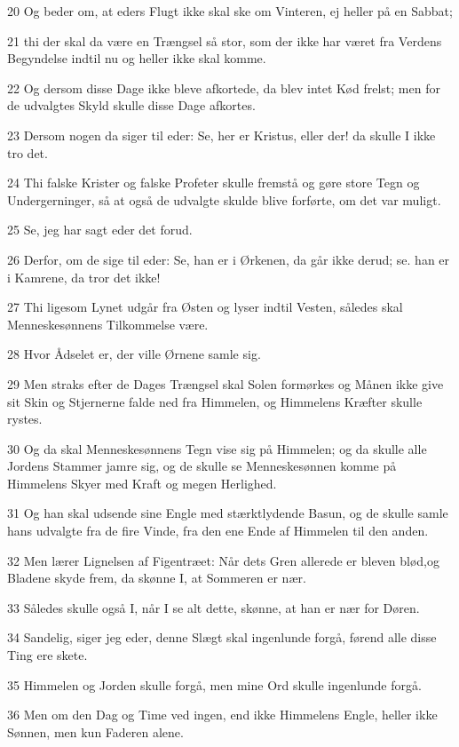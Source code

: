 \par 20 Og beder om, at eders Flugt ikke skal ske om Vinteren, ej heller på en Sabbat;
\par 21 thi der skal da være en Trængsel så stor, som der ikke har været fra Verdens Begyndelse indtil nu og heller ikke skal komme.
\par 22 Og dersom disse Dage ikke bleve afkortede, da blev intet Kød frelst; men for de udvalgtes Skyld skulle disse Dage afkortes.
\par 23 Dersom nogen da siger til eder: Se, her er Kristus, eller der! da skulle I ikke tro det.
\par 24 Thi falske Krister og falske Profeter skulle fremstå og gøre store Tegn og Undergerninger, så at også de udvalgte skulde blive forførte, om det var muligt.
\par 25 Se, jeg har sagt eder det forud.
\par 26 Derfor, om de sige til eder: Se, han er i Ørkenen, da går ikke derud; se. han er i Kamrene, da tror det ikke!
\par 27 Thi ligesom Lynet udgår fra Østen og lyser indtil Vesten, således skal Menneskesønnens Tilkommelse være.
\par 28 Hvor Ådselet er, der ville Ørnene samle sig.
\par 29 Men straks efter de Dages Trængsel skal Solen formørkes og Månen ikke give sit Skin og Stjernerne falde ned fra Himmelen, og Himmelens Kræfter skulle rystes.
\par 30 Og da skal Menneskesønnens Tegn vise sig på Himmelen; og da skulle alle Jordens Stammer jamre sig, og de skulle se Menneskesønnen komme på Himmelens Skyer med Kraft og megen Herlighed.
\par 31 Og han skal udsende sine Engle med stærktlydende Basun, og de skulle samle hans udvalgte fra de fire Vinde, fra den ene Ende af Himmelen til den anden.
\par 32 Men lærer Lignelsen af Figentræet: Når dets Gren allerede er bleven blød,og Bladene skyde frem, da skønne I, at Sommeren er nær.
\par 33 Således skulle også I, når I se alt dette, skønne, at han er nær for Døren.
\par 34 Sandelig, siger jeg eder, denne Slægt skal ingenlunde forgå, førend alle disse Ting ere skete.
\par 35 Himmelen og Jorden skulle forgå, men mine Ord skulle ingenlunde forgå.
\par 36 Men om den Dag og Time ved ingen, end ikke Himmelens Engle, heller ikke Sønnen, men kun Faderen alene.

